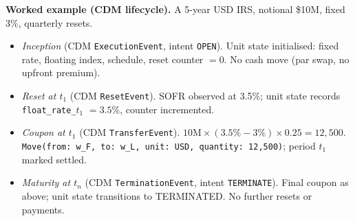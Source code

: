 \medskip
\noindent\textbf{Worked example (CDM lifecycle).} A 5-year USD IRS, notional \$10M, fixed 3\%, quarterly resets.

\begin{itemize}[nosep]
\item \emph{Inception} (CDM \texttt{ExecutionEvent}, intent \texttt{OPEN}). Unit state initialised: fixed rate, floating index, schedule, reset counter $=0$. No cash move (par swap, no upfront premium).
\item \emph{Reset at $t_1$} (CDM \texttt{ResetEvent}). SOFR observed at 3.5\%; unit state records \texttt{float\_rate\_$t_1$} $=3.5\%$, counter incremented.
\item \emph{Coupon at $t_1$} (CDM \texttt{TransferEvent}). $10\text{M}\times(3.5\%-3\%)\times0.25 = 12{,}500$. \texttt{Move(from: w\_F, to: w\_L, unit: USD, quantity: 12{,}500)}; period $t_1$ marked settled.
\item \emph{Maturity at $t_n$} (CDM \texttt{TerminationEvent}, intent \texttt{TERMINATE}). Final coupon as above; unit state transitions to TERMINATED. No further resets or payments.
\end{itemize}

\clearpage
